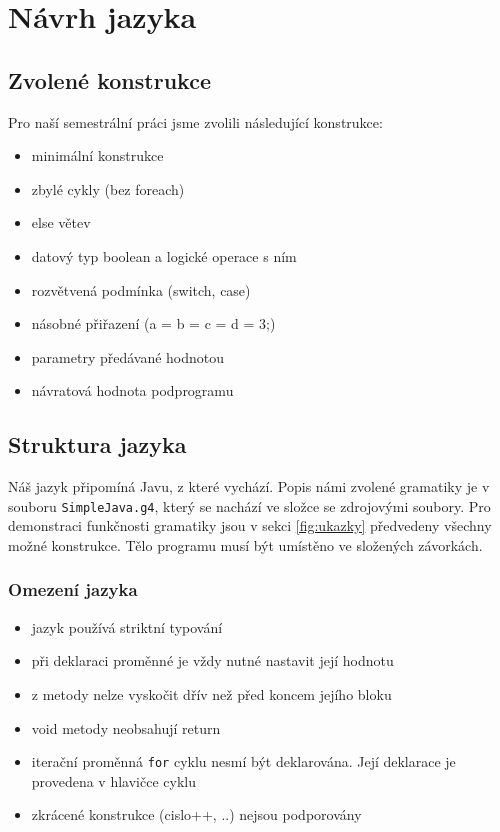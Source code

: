 \documentclass[12pt, a4paper]{article}
\begin{document}
\section{Návrh jazyka}
\subsection{Zvolené konstrukce}
Pro naší semestrální práci jsme zvolili následující konstrukce:
\begin{itemize}
\item minimální konstrukce
\item zbylé cykly (bez foreach)
\item else větev
\item datový typ boolean a logické operace s ním
\item rozvětvená podmínka (switch, case)
\item násobné přiřazení (a = b = c = d = 3;)
\item parametry předávané hodnotou
\item návratová hodnota podprogramu
\end{itemize}

\subsection{Struktura jazyka}
Náš jazyk připomíná Javu, z které vychází. Popis námi zvolené gramatiky je v souboru \texttt{SimpleJava.g4}, který se nachází ve složce se zdrojovými soubory. Pro demonstraci funkčnosti gramatiky jsou v sekci \ref{fig:ukazky} předvedeny všechny možné konstrukce. Tělo programu musí být umístěno ve složených závorkách.

\subsubsection{Omezení jazyka}
\begin{itemize}
\item jazyk používá striktní typování
\item při deklaraci proměnné je vždy nutné nastavit její hodnotu
\item z metody nelze vyskočit dřív než před koncem jejího bloku
\item void metody neobsahují return
\item iterační proměnná \texttt{for} cyklu nesmí být deklarována. Její deklarace je provedena v hlavičce cyklu
\item zkrácené konstrukce (cislo++, ..) nejsou podporovány
\end{itemize}
\end{document}
